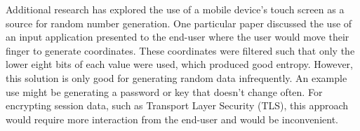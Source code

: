 
Additional research has explored the use of a mobile device's touch 
screen as a source for random number generation.  One particular paper 
\cite{montville2003random} discussed the use of an input application presented 
to the end-user where the user would move their finger to generate 
coordinates.  These coordinates were filtered such that only the lower 
eight bits of each value were used, which produced good entropy.  However, this 
solution is only good for generating random data infrequently.  An 
example use might be generating a password or key that doesn't change
often.  For encrypting session data, such as Transport Layer Security (TLS),
this approach would require more interaction from the end-user and would be
inconvenient.
